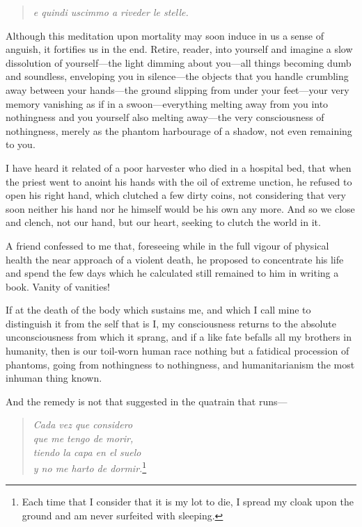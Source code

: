 \begin{verse}
\textit{e quindi uscimmo a riveder le stelle.}
\end{verse}

Although this meditation upon mortality may soon induce in us a sense
of anguish, it fortifies us in the end. Retire, reader, into yourself
and imagine a slow dissolution of your\-self---the light dimming about
you---all things becoming dumb and soundless, enveloping you in
silence---the objects that you handle crumbling away between your
hands---the ground slipping from under your feet---your very memory
vanishing as if in a swoon---eve\-ry\-thing melting away from you into
nothingness and you yourself also melting a\-way---the very
consciousness of nothingness, merely as the phantom harbourage of a
shadow, not even remaining to you.

I have heard it related of a poor harvester who died in a hospital
bed, that when the priest went to anoint his hands with the oil of
extreme unction, he refused to open his right hand, which clutched a
few dirty coins, not considering that very soon neither his hand nor
he himself would be his own any more. And so we close and clench, not
our hand, but our heart, seeking to clutch the world in it.

A friend confessed to me that, foreseeing while in the full vigour of
physical health the near approach of a violent death, he proposed to
concentrate his life and spend the few days which he calculated still
remained to him in writing a book. Vanity of vanities!

If at the death of the body which sustains me, and which I call mine
to distinguish it from the self that is I, my consciousness returns to
the absolute unconsciousness from which it sprang, and if a like fate
befalls all my brothers in humanity, then is our toil-worn human race
nothing but a fatidical procession of phantoms, going from nothingness
to nothingness, and humanitarianism the most inhuman thing known.

And the remedy is not that suggested in the quatrain that
runs---

\begin{verse}
\textit{Cada vez que considero\\
que me tengo de morir,\\
tiendo la capa en el suelo\\
y no me harto de dormir.}\footnote{Each time that I consider that it
is my lot to die, I spread my cloak upon the ground and am never
surfeited with sleeping.}
\end{verse}

